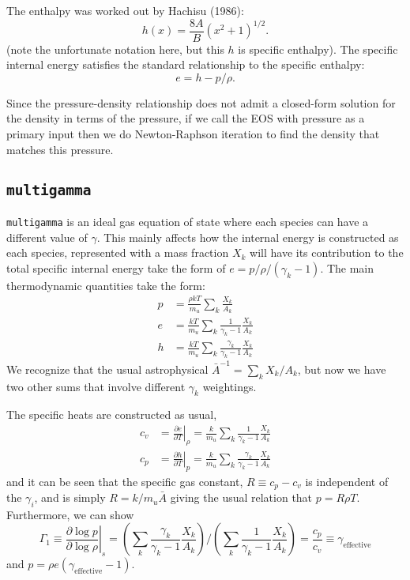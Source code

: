 The enthalpy was worked out by Hachisu (1986):
\begin{equation}
  h(x) = \frac{8A}{B}\left(x^2 + 1\right)^{1/2}.
\end{equation}
(note the unfortunate notation here, but this $h$ is specific
enthalpy).  The specific internal energy satisfies the standard
relationship to the specific enthalpy:
\begin{equation}
  e = h - p / \rho.
\end{equation}

Since the pressure-density relationship does not admit a closed-form
solution for the density in terms of the pressure, if we call the EOS
with pressure as a primary input then we do Newton-Raphson iteration
to find the density that matches this pressure.


\subsection{\tt multigamma}

{\tt multigamma} is an ideal gas equation of state where each
  species can have a different value of $\gamma$.  This mainly affects
  how the internal energy is constructed as each species, represented
  with a mass fraction $X_k$ will have its contribution to the total
  specific internal energy take the form of $e = p/\rho/(\gamma_k -
  1)$.  The main thermodynamic quantities take the form:
\begin{align}
p &= \frac{\rho k T}{m_u} \sum_k \frac{X_k}{A_k} \\
e &= \frac{k T}{m_u} \sum_k \frac{1}{\gamma_k - 1} \frac{X_k}{A_k} \\
h &= \frac{k T}{m_u} \sum_k \frac{\gamma_k}{\gamma_k - 1} \frac{X_k}{A_k}
\end{align}
We recognize that the usual astrophysical $\bar{A}^{-1} = \sum_k
X_k/A_k$, but now we have two other sums that involve different
$\gamma_k$ weightings.

The specific heats are constructed as usual,
\begin{align}
c_v &= \left . \frac{\partial e}{\partial T} \right |_\rho =
    \frac{k}{m_u} \sum_k \frac{1}{\gamma_k - 1} \frac{X_k}{A_k} \\
c_p &= \left . \frac{\partial h}{\partial T} \right |_p =
    \frac{k}{m_u} \sum_k \frac{\gamma_k}{\gamma_k - 1} \frac{X_k}{A_k}
\end{align}
and it can be seen that the specific gas constant, $R \equiv c_p -
c_v$ is independent of the $\gamma_i$, and is simply $R =
k/m_u\bar{A}$ giving the usual relation that $p = R\rho T$.
Furthermore, we can show
\begin{equation}
\Gamma_1 \equiv \left . \frac{\partial \log p}{\partial \log \rho} \right |_s =
   \left ( \sum_k \frac{\gamma_k}{\gamma_k - 1} \frac{X_k}{A_k} \right ) \bigg /
   \left ( \sum_k \frac{1}{\gamma_k - 1} \frac{X_k}{A_k} \right ) =
\frac{c_p}{c_v} \equiv \gamma_\mathrm{effective}
\end{equation}
and $p = \rho e (\gamma_\mathrm{effective} - 1)$.

